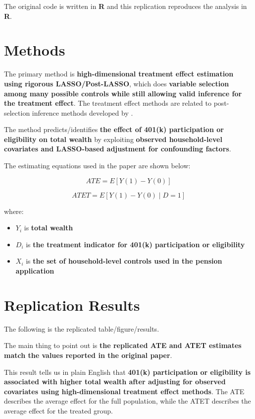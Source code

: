 \documentclass[12pt]{article}
\begin{document}
The original code is written in \textbf{R} and this replication reproduces the analysis in \textbf{R}.

\section{Methods}

The primary method is \textbf{high-dimensional treatment effect estimation using rigorous LASSO/Post-LASSO}, which does \textbf{variable selection among many possible controls while still allowing valid inference for the treatment effect}. The treatment effect methods are related to post-selection inference methods developed by \citet{belloni2014treatment}.

The method predicts/identifies \textbf{the effect of 401(k) participation or eligibility on total wealth} by exploiting \textbf{observed household-level covariates and LASSO-based adjustment for confounding factors}.

The estimating equations used in the paper are shown below:

\begin{equation}
ATE = E[Y(1)-Y(0)]
\end{equation}

\begin{equation}
ATET = E[Y(1)-Y(0)\mid D=1]
\end{equation}

where:
\begin{itemize}
    \item $Y_i$ is \textbf{total wealth}
    \item $D_i$ is \textbf{the treatment indicator for 401(k) participation or eligibility}
    \item $X_i$ is \textbf{the set of household-level controls used in the pension application}
\end{itemize}

\section{Replication Results}

The following is the replicated table/figure/results.



The main thing to point out is \textbf{the replicated ATE and ATET estimates match the values reported in the original paper}.

This result tells us in plain English that \textbf{401(k) participation or eligibility is associated with higher total wealth after adjusting for observed covariates using high-dimensional treatment effect methods}. The ATE describes the average effect for the full population, while the ATET describes the average effect for the treated group.
\end{document}
